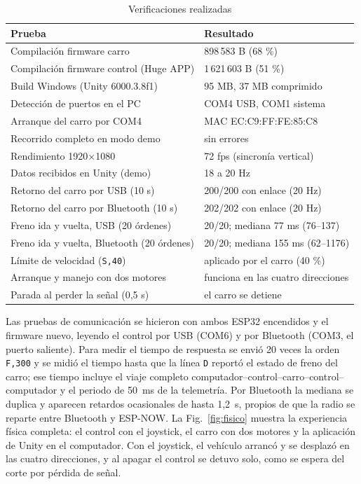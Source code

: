 \documentclass[journal]{IEEEtran}
\begin{document}
\begin{table}[t]
\centering
\caption{Verificaciones realizadas}
\label{tab:pruebas}
\begin{tabular}{@{}p{4.3cm}p{3.6cm}@{}}
\toprule
Prueba & Resultado \\
\midrule
Compilación firmware carro & 898\,583 B (68 \%) \\
Compilación firmware control (Huge APP) & 1\,621\,603 B (51 \%) \\
Build Windows (Unity 6000.3.8f1) & 95 MB, 37 MB comprimido \\
Detección de puertos en el PC & COM4 USB, COM1 sistema \\
Arranque del carro por COM4 & MAC EC:C9:FF:FE:85:C8 \\
Recorrido completo en modo demo & sin errores \\
Rendimiento 1920$\times$1080 & 72 fps (sincronía vertical) \\
Datos recibidos en Unity (demo) & 18 a 20 Hz \\
Retorno del carro por USB (10 s) & 200/200 con enlace (20 Hz) \\
Retorno del carro por Bluetooth (10 s) & 202/202 con enlace (20 Hz) \\
Freno ida y vuelta, USB (20 órdenes) & 20/20; mediana 77 ms (76--137) \\
Freno ida y vuelta, Bluetooth (20 órdenes) & 20/20; mediana 155 ms (62--1176) \\
Límite de velocidad (\texttt{S,40}) & aplicado por el carro (40 \%) \\
Arranque y manejo con dos motores & funciona en las cuatro direcciones \\
Parada al perder la señal (0,5 s) & el carro se detiene \\
\bottomrule
\end{tabular}
\end{table}

Las pruebas de comunicación se hicieron con ambos ESP32 encendidos y el firmware nuevo, leyendo el control por USB (COM6) y por Bluetooth (COM3, el puerto saliente). Para medir el tiempo de respuesta se envió 20 veces la orden \texttt{F,300} y se midió el tiempo hasta que la línea \texttt{D} reportó el estado de freno del carro; ese tiempo incluye el viaje completo computador--control--carro--control--computador y el periodo de 50~ms de la telemetría. Por Bluetooth la mediana se duplica y aparecen retardos ocasionales de hasta 1,2~s, propios de que la radio se reparte entre Bluetooth y ESP-NOW. La Fig.~\ref{fig:fisico} muestra la experiencia física completa: el control con el joystick, el carro con dos motores y la aplicación de Unity en el computador. Con el joystick, el vehículo arrancó y se desplazó en las cuatro direcciones, y al apagar el control se detuvo solo, como se espera del corte por pérdida de señal.
\end{document}
